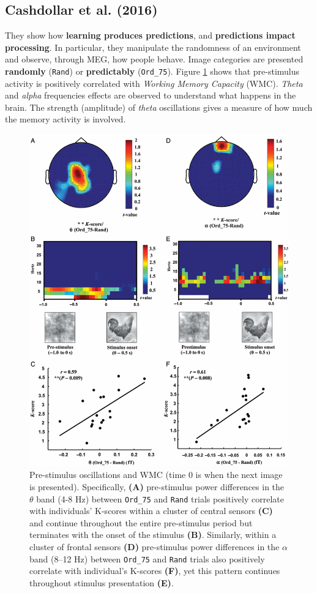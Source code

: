 \subsection{Cashdollar et al. (2016)}
They show how \textbf{learning produces predictions}, and \textbf{predictions impact processing}. In particular, they manipulate the randomness of an environment and observe, through MEG, how people behave. Image categories are presented \textbf{randomly} (\texttt{Rand}) or \textbf{predictably} (\texttt{Ord\_75}). Figure \ref{fig:cashdollar} shows that pre-stimulus activity is positively correlated with \textit{Working Memory Capacity} (WMC). \textit{Theta} and \textit{alpha} frequencies effects are observed to understand what happens in the brain. The strength (amplitude) of \textit{theta} oscillations gives a measure of how much the memory activity is involved.

\begin{figure}[!ht]
    \centering
    \captionsetup{width=.8\linewidth}
    \includegraphics[width=0.75\linewidth]{images/cashdollar.png}
    \caption{Pre-stimulus oscillations and WMC (time 0 is when the next image is presented). Specifically, \textbf{(A)} pre-stimulus power differences in the $\theta$ band (4-8 Hz) between \texttt{Ord\_75} and \texttt{Rand} trials positively correlate with individuals' K-scores within a cluster of central sensors \textbf{(C)} and continue throughout the entire pre-stimulus period but terminates with the onset of the stimulus \textbf{(B)}. Similarly, within a cluster of frontal sensors \textbf{(D)} pre-stimulus power differences in the $\alpha$ band (8–12 Hz) between \texttt{Ord\_75} and \texttt{Rand} trials also positively correlate with individual's K-scores \textbf{(F)}, yet this pattern continues throughout stimulus presentation \textbf{(E)}.}
    \label{fig:cashdollar}
\end{figure}

